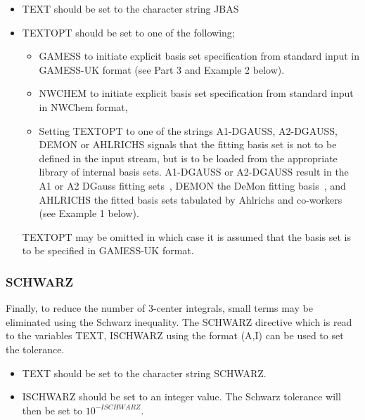 \documentclass[11pt,fleqn]{article}
\begin{document}
\begin{itemize}
\item TEXT should be set to the character string JBAS
\item TEXTOPT should be set to one of the following;
  \begin{itemize}
  \item GAMESS to initiate explicit basis set specification from
standard input in GAMESS-UK format (see Part 3 and Example 2 below).
  \item NWCHEM to initiate explicit basis set specification from
standard input in NWChem format,
  \item Setting TEXTOPT to one of the strings A1-DGAUSS, A2-DGAUSS,
DEMON or AHLRICHS signals that the fitting basis set is not to be
defined in the input stream, but is to be loaded from the appropriate
library of internal basis sets. A1-DGAUSS or A2-DGAUSS result in the A1
or A2 DGauss fitting sets~\cite{godbout}, DEMON the DeMon fitting
basis~\cite{godbout}, and AHLRICHS the fitted basis sets tabulated by
Ahlrichs and co-workers~\cite{ahlrichs} (see Example 1 below).
\end{itemize}
TEXTOPT may be omitted in which case it is assumed that the basis set is
to be specified in GAMESS-UK format.
\end{itemize}

\subsubsection[SCHWARZ]{SCHWARZ}
Finally, to reduce the number of 3-center integrals, small terms may be 
eliminated using the Schwarz inequality. The SCHWARZ directive which is read
to the variables TEXT, ISCHWARZ using the format (A,I) can be used to set
the tolerance.
\begin{itemize}
\item TEXT should be set to the character string SCHWARZ.
\item ISCHWARZ should be set to an integer value. The Schwarz tolerance will 
      then be set to $10^{-ISCHWARZ}$.
\end{itemize}
\end{document}
